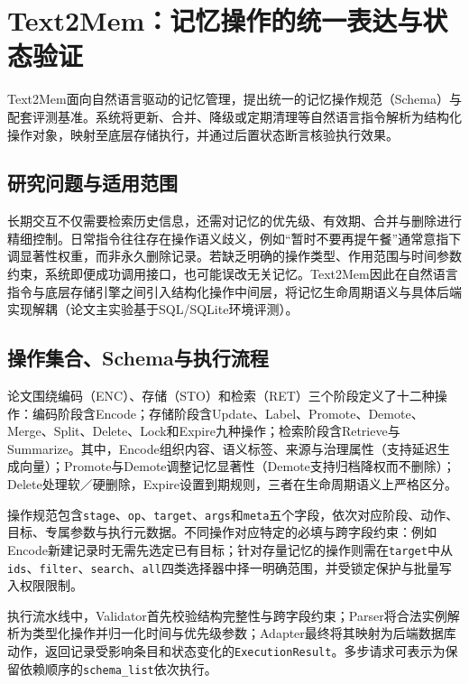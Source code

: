 \section{Text2Mem：记忆操作的统一表达与状态验证}
\label{sec:text2mem}

Text2Mem面向自然语言驱动的记忆管理，提出统一的记忆操作规范（Schema）与配套评测基准。系统将更新、合并、降级或定期清理等自然语言指令解析为结构化操作对象，映射至底层存储执行，并通过后置状态断言核验执行效果。

\subsection{研究问题与适用范围}

长期交互不仅需要检索历史信息，还需对记忆的优先级、有效期、合并与删除进行精细控制。日常指令往往存在操作语义歧义，例如“暂时不要再提午餐”通常意指下调显著性权重，而非永久删除记录。若缺乏明确的操作类型、作用范围与时间参数约束，系统即便成功调用接口，也可能误改无关记忆。Text2Mem因此在自然语言指令与底层存储引擎之间引入结构化操作中间层，将记忆生命周期语义与具体后端实现解耦（论文主实验基于SQL/SQLite环境评测）。

\subsection{操作集合、Schema与执行流程}

论文围绕编码（ENC）、存储（STO）和检索（RET）三个阶段定义了十二种操作：编码阶段含Encode；存储阶段含Update、Label、Promote、Demote、Merge、Split、Delete、Lock和Expire九种操作；检索阶段含Retrieve与Summarize。其中，Encode组织内容、语义标签、来源与治理属性（支持延迟生成向量）；Promote与Demote调整记忆显著性（Demote支持归档降权而不删除）；Delete处理软／硬删除，Expire设置到期规则，三者在生命周期语义上严格区分。

操作规范包含\texttt{stage}、\texttt{op}、\texttt{target}、\texttt{args}和\texttt{meta}五个字段，依次对应阶段、动作、目标、专属参数与执行元数据。不同操作对应特定的必填与跨字段约束：例如Encode新建记录时无需先选定已有目标；针对存量记忆的操作则需在\texttt{target}中从\texttt{ids}、\texttt{filter}、\texttt{search}、\texttt{all}四类选择器中择一明确范围，并受锁定保护与批量写入权限限制。

执行流水线中，Validator首先校验结构完整性与跨字段约束；Parser将合法实例解析为类型化操作并归一化时间与优先级参数；Adapter最终将其映射为后端数据库动作，返回记录受影响条目和状态变化的\texttt{ExecutionResult}。多步请求可表示为保留依赖顺序的\texttt{schema\_list}依次执行。

